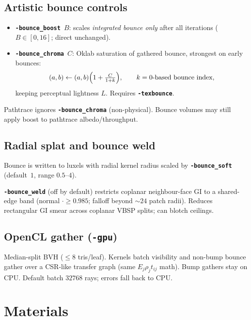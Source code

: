 \documentclass[11pt,a4paper]{article}
\newcommand{\flag}[1]{\texttt{\bfseries #1}}
\begin{document}
\subsection{Artistic bounce controls}

\begin{itemize}[leftmargin=1.4em]
  \item \flag{-bounce\_boost}~$B$: scales \emph{integrated bounce only} after
        all iterations ($B\in[0,16]$; direct unchanged).
  \item \flag{-bounce\_chroma}~$C$: Oklab saturation of gathered bounce,
        strongest on early bounces:
        \begin{equation}
          (a,b)\leftarrow(a,b)\Bigl(1+\tfrac{C}{1+k}\Bigr),
          \qquad k=\text{0-based bounce index},
        \end{equation}
        keeping perceptual lightness $L$. Requires \flag{-texbounce}.
\end{itemize}

\begin{warnbox}
  Pathtrace ignores \flag{-bounce\_chroma} (non-physical). Bounce volumes may
  still apply boost to pathtrace albedo/throughput.
\end{warnbox}

\subsection{Radial splat and bounce weld}

Bounce is written to luxels with radial kernel radius scaled by
\flag{-bounce\_soft} (default~$1$, range $0.5$--$4$).

\flag{-bounce\_weld} (off by default) restricts coplanar neighbour-face GI to a
shared-edge band (normal $\cdot\ge 0.985$; falloff beyond $\sim 24$ patch radii).
Reduces rectangular GI smear across coplanar VBSP splits; can blotch ceilings.

\subsection{OpenCL gather (\flag{-gpu})}

Median-split BVH ($\le 8$ tris/leaf). Kernels batch visibility and non-bump
bounce gather over a CSR-like transfer graph (same $E_j\rho_j t_{ij}$ math).
Bump gathers stay on CPU. Default batch $32768$ rays; errors fall back to CPU.

\section{Materials}
\label{sec:materials}
\end{document}
